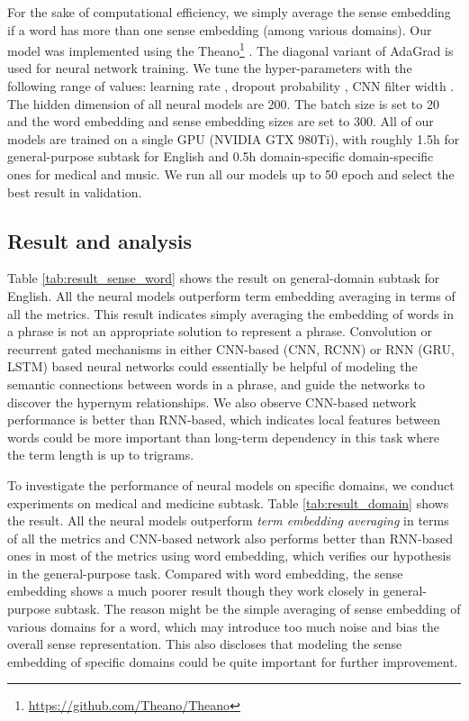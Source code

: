 \documentclass[11pt,a4paper]{article}
\begin{document}
For the sake of computational efficiency, we simply average the sense embedding if a word has more than one sense embedding (among various domains). Our model was implemented using the Theano\footnote{\url{https://github.com/Theano/Theano}} . The diagonal variant of AdaGrad \cite{Duchi2010Adaptive} is used for neural network training. We tune the hyper-parameters with the following range of values: learning rate , dropout probability , CNN filter width . The hidden dimension of all neural models are 200. The batch size is set to 20 and the word embedding and sense embedding sizes are set to 300. All of our models are trained on a single GPU (NVIDIA GTX 980Ti), with roughly 1.5h for general-purpose subtask for English and 0.5h domain-specific domain-specific ones for medical and music. We run all our models up to 50 epoch and select the best result in validation.


\subsection{Result and analysis}
Table \ref{tab:result_sense_word} shows the result on general-domain subtask for English. All the neural models outperform term embedding averaging in terms of all the metrics. This result indicates simply averaging the embedding of words in a phrase is not an appropriate solution to represent a phrase. Convolution or recurrent gated mechanisms in either CNN-based (CNN, RCNN) or RNN (GRU, LSTM) based neural networks could essentially be helpful of modeling the semantic connections between words in a phrase, and guide the networks to discover the hypernym relationships. We also observe CNN-based network performance is better than RNN-based, which indicates local features between words could be more important than long-term dependency in this task where the term length is up to trigrams.

To investigate the performance of neural models on specific domains, we conduct experiments on medical and medicine subtask. Table \ref{tab:result_domain} shows the result. All the neural models outperform \emph{term embedding averaging} in terms of all the metrics and CNN-based network also performs better than RNN-based ones in most of the metrics using word embedding, which verifies our hypothesis in the general-purpose task. Compared with word embedding, the sense embedding shows a much poorer result though they work closely in general-purpose subtask. The reason might be the simple averaging of sense embedding of various domains for a word, which may introduce too much noise and bias the overall sense representation. This also discloses that modeling the sense embedding of specific domains could be quite important for further improvement.
\end{document}
